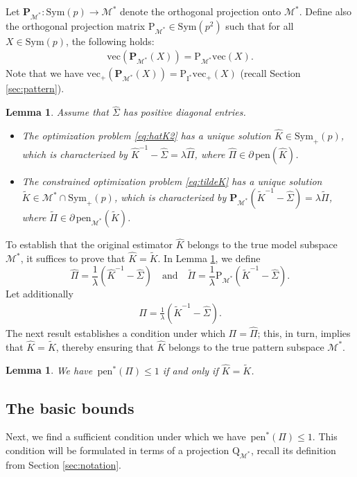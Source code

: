 \documentclass[12pt]{amsart}
\numberwithin{equation}{section}
\numberwithin{equation}{section}
\newtheorem{lemma}[thm]{Lemma}
\theoremstyle{definition}
\newcommand{\Q}{\mathrm{Q}_{\Mast}}
\newcommand{\I}{\mathrm{I}}
\newcommand{\norm}{\,\mathrm{pen}}
\newcommand{\normd}{\,\mathrm{pen}^\ast}
\newcommand{\norms}{\,\mathrm{pen}_{\mathcal{M}^\ast}}
\newcommand{\proj}{\mathrm{\mathbf{P}}_{\mathcal{M}^\ast}}
\newcommand{\PM}{\mathrm{P}_{\mathcal{M}^\ast}}
\newcommand{\PP}{\mathrm{P}}
\newcommand{\Mast}{\mathcal{M}^\ast}
\renewcommand{\v}[1]{\mathrm{vec}(#1)}
\newcommand{\vp}[1]{\mathrm{vec_+}(#1)}
\begin{document}
Let $\proj\colon \mathrm{Sym}(p)\to \Mast$ denote the orthogonal projection onto $\Mast$.
Define also the orthogonal projection matrix $\PM \in\mathrm{Sym}(p^2)$ such that for all $X\in\mathrm{Sym}(p)$, the following holds: 
\begin{align*}
	\v{\proj(X)}=\PM \v{X}.
\end{align*}
Note that we have $\vp{\proj(X)}=\PP_{\I^\ast} \vp{X}$ (recall Section \ref{sec:pattern}).

\begin{lemma}\label{lem:1}
	Assume that $\hat{\Sigma}$ has positive diagonal entries.
	\begin{itemize}
		\item[(i)] The optimization problem \eqref{eq:hatK2} has a unique solution $\hat{K}\in\mathrm{Sym}_+(p)$, which is characterized by
		$\hat{K}^{-1}-\hat{\Sigma} = \lambda\hat{\Pi}$, 
		where $\hat{\Pi}\in \partial \norm(\hat{K})$.
		\item[(ii)] The constrained optimization problem \eqref{eq:tildeK} has a unique solution 
		$\tilde{K}\in \Mast\cap\mathrm{Sym}_+(p)$, which is  characterized by $\proj(\tilde{K}^{-1}-\hat{\Sigma}) = \lambda\tilde\Pi$,
		where $\tilde\Pi\in \partial \norms(\tilde{K})$.
	\end{itemize}
\end{lemma}

To establish that the original estimator $\hat{K}$ belongs to the true model subspace $\Mast$, it suffices to prove that $\hat{K}=\tilde{K}$. In Lemma \ref{lem:1}, we define
\[
\hat{\Pi} = \frac{1}{\lambda}(\hat{K}^{-1}-\hat{\Sigma})\quad\mbox{and}\quad \tilde{\Pi} = \frac{1}{\lambda}\PM(\tilde{K}^{-1}-\hat{\Sigma}). 
\]
Let additionally
\begin{align*}
	\Pi = \frac{1}{\lambda}(\tilde{K}^{-1}-\hat{\Sigma}).
\end{align*} 
The next result establishes a condition under which $\Pi=\hat{\Pi}$; this, in turn, implies that $\hat{K}=\tilde{K}$, thereby ensuring that $\hat{K}$ belongs to the true pattern subspace $\Mast$. 


\begin{lemma}\label{lem:hatKtildeK}
	We have $\normd(\Pi)\leq 1$ if and only if $\hat{K}=\tilde{K}$. 
\end{lemma}

\subsection{The basic bounds}\label{sec:bb}
Next, we find a sufficient condition under which we have $\normd(\Pi)\leq 1$. This condition will be formulated in terms of a projection $\Q$, recall its definition from Section \ref{sec:notation}.
\end{document}
